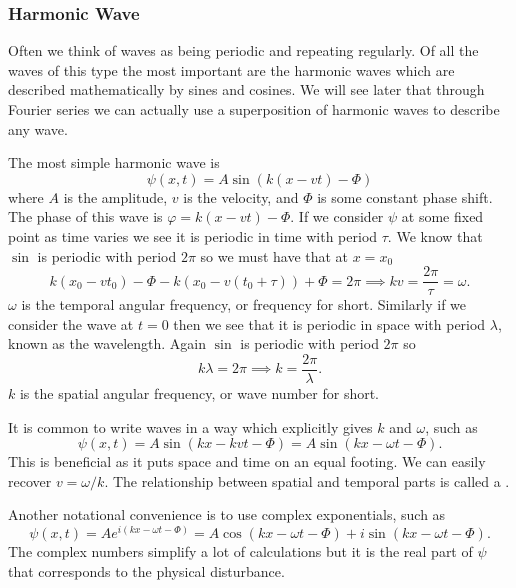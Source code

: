     \subsubsection{Harmonic Wave}
    Often we think of waves as being periodic and repeating regularly.
    Of all the waves of this type the most important are the harmonic waves which are described mathematically by sines and cosines.
    We will see later that through Fourier series we can actually use a superposition of harmonic waves to describe any wave.
    
    The most simple harmonic wave is
    \[\psi(x, t) = A\sin(k(x - vt) - \Phi)\]
    where \(A\) is the amplitude, \(v\) is the velocity, and \(\Phi\) is some constant phase shift.
    The phase of this wave is \(\varphi = k(x - vt) - \Phi\).
    If we consider \(\psi\) at some fixed point as time varies we see it is periodic in time with period \(\tau\).
    We know that \(\sin\) is periodic with period \(2\pi\) so we must have that at \(x = x_0\)
    \[k(x_0 - vt_0) - \Phi - k(x_0 - v(t_0 + \tau)) + \Phi = 2\pi \implies kv = \frac{2\pi}{\tau} = \omega.\]
    \(\omega\) is the temporal angular frequency, or frequency for short.
    Similarly if we consider the wave at \(t = 0\) then we see that it is periodic in space with period \(\lambda\), known as the wavelength.
    Again \(\sin\) is periodic with period \(2\pi\) so
    \[k\lambda = 2\pi \implies k = \frac{2\pi}{\lambda}.\]
    \(k\) is the spatial angular frequency, or wave number for short.
    
    It is common to write waves in a way which explicitly gives \(k\) and \(\omega\), such as
    \[\psi(x, t) = A\sin(kx - kvt - \Phi) = A\sin(kx - \omega t - \Phi).\]
    This is beneficial as it puts space and time on an equal footing.
    We can easily recover \(v = \omega / k\).
    The relationship between spatial and temporal parts is called a .
    
    Another notational convenience is to use complex exponentials, such as
    \[\psi(x, t) = Ae^{i(kx - \omega t - \Phi)} = A\cos(kx - \omega t - \Phi) + i\sin(kx - \omega t - \Phi).\]
    The complex numbers simplify a lot of calculations but it is the real part of \(\psi\) that corresponds to the physical disturbance.
    
